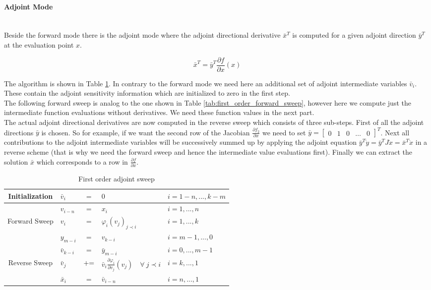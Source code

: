 \documentclass{scrartcl}[12pt, halfparskip]
\numberwithin{equation}{section}
\numberwithin{figure}{section}
\numberwithin{table}{section}
\begin{document}
\paragraph{Adjoint Mode}\mbox{}\\
Beside the forward mode there is the adjoint mode where the adjoint directional derivative $\bar{x}^T$ is computed for a given adjoint direction $\bar{y}^T$ at the evaluation point $x$. 

\begin{equation}
\bar{x}^T = \bar{y}^T \frac{\partial f}{\partial x}(x)
\end{equation}

The algorithm is shown in Table \ref{tab:first_order_adjoint_sweep}. In contrary to the forward mode we need here an additional set of adjoint intermediate variables $\bar{v}_i$. These contain the adjoint sensitivity information which are initialized to zero in the first step. \\
The following forward sweep is analog to the one shown in Table \ref{tab:first_order_forward_sweep}, however here we compute just the intermediate function evaluations without derivatives. We need these function values in the next part. \\
The actual adjoint directional derivatives are now computed in the reverse sweep which consists of three sub-steps. First of all the adjoint directions $\bar{y}$ is chosen. So for example, if we want the second row of the Jacobian $\frac{\partial f_2}{\partial x}$ we need to set $\bar{y} = \begin{bmatrix}
0 & 1 & 0 & \dots & 0
\end{bmatrix}^T$.
Next all contributions to the adjoint intermediate variables will be successively summed up by applying the adjoint equation $\bar{y}^T \dot{y} = \bar{y}^T J \dot{x} = \bar{x}^T \dot{x}$ in a reverse scheme (that is why we need the forward sweep and hence the intermediate value evaluations first). Finally we can extract the solution $\bar{x}$ which corresponds to a row in $\frac{\partial f}{\partial x}$.


\begin{table}[H]
	\centering
	\begin{tabular}{| c | l c l | l |} \hline
		Initialization & $\bar{v}_i$ & $=$ & $0$ & $i=1-n,...,k-m$ \\ \hline
		& $v_{i-n}$ & $=$ & $x_i$ & $i=1,...,n$ \\
		Forward Sweep & $v_{i}$ & $=$ & $\varphi_i(v_j)_{j \prec i}$ & $i=1,...,k$ \\
		& $y_{m-i}$ & $=$ & $v_{k-i}$ & $i=m-1,...,0$ \\ \hline
		& $\bar{v}_{k-i}$ & $=$ & $\bar{y}_{m-i}$ & $i=0,...,m-1$ \\
		Reverse Sweep & $\bar{v}_j$ & $+ \hspace{-0.1cm} =$ & $\bar{v}_i \frac{\partial \varphi_i}{\partial v_j}(v_j) \quad \forall \ j \prec i$ & $i=k,...,1$ \\
		& $\bar{x}_i$ & $=$ & $\bar{v}_{i-n}$ & $i=n,...,1$ \\ \hline
	\end{tabular}
	\caption{First order adjoint sweep}
	\label{tab:first_order_adjoint_sweep}
\end{table}
\end{document}
